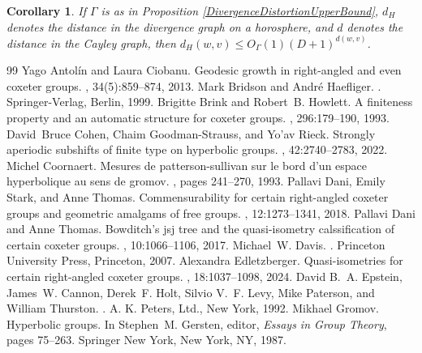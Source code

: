 \documentclass[10pt,a4paper]{amsart}
\newtheorem{corollary}[theorem]{Corollary}
\theoremstyle{definition}
\theoremstyle{remark}
\begin{document}
	\begin{corollary}
		
		If $\Gamma$ is as in Proposition \ref{DivergenceDistortionUpperBound}, $d_H$ denotes the distance in the divergence graph on a horosphere, and $d$ denotes the distance in the Cayley graph, then $d_H(w,v)\le O_\Gamma(1)(D+1)^{d(w,v)}$.
		
	\end{corollary}
	

\begin{thebibliography}{99}
 Yago Antolín and Laura Ciobanu. \newblock Geodesic growth in right-angled and even coxeter groups. , 34(5):859--874, 2013.
 Mark Bridson and Andr\'e Haefliger. . \newblock Springer-Verlag, Berlin, 1999.
 Brigitte Brink and Robert~B. Howlett. \newblock A finiteness property and an automatic structure for coxeter groups. , 296:179--190, 1993.
 David~Bruce Cohen, Chaim Goodman-Strauss, and Yo'av Rieck. \newblock Strongly aperiodic subshifts of finite type on hyperbolic groups. , 42:2740--2783, 2022.
 Michel Coornaert. \newblock Mesures de patterson-sullivan sur le bord d’un espace hyperbolique au sens de gromov. , pages 241--270, 1993.
 Pallavi Dani, Emily Stark, and Anne Thomas. \newblock Commensurability for certain right-angled coxeter groups and geometric amalgams of free groups. , 12:1273--1341, 2018.
 Pallavi Dani and Anne Thomas. \newblock Bowditch's jsj tree and the quasi-isometry calssification of certain coxeter groups. , 10:1066--1106, 2017.
 Michael~W. Davis. . \newblock Princeton University Press, Princeton, 2007.
 Alexandra Edletzberger. \newblock Quasi-isometries for certain right-angled coxeter groups. , 18:1037--1098, 2024.
 David B.~A. Epstein, James~W. Cannon, Derek~F. Holt, Silvio V.~F. Levy, Mike Paterson, and William Thurston. . \newblock A. K. Peters, Ltd., New York, 1992.
 Mikhael Gromov. \newblock Hyperbolic groups. \newblock In Stephen~M. Gersten, editor, {\em Essays in Group Theory}, pages 75--263. Springer New York, New York, NY, 1987.

\end{thebibliography}
\end{document}
